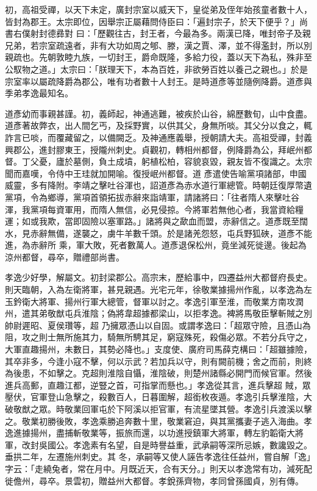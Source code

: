 \begin{pinyinscope}
 初，高祖受禪，以天下未定，廣封宗室以威天下，皇從弟及侄年始孩童者數十人，皆封為郡王。太宗即位，因舉宗正屬藉問侍臣曰：「遍封宗子，於天下便乎？」尚書右僕射封德彞對
 曰：「歷觀往古，封王者，今最為多。兩漢已降，唯封帝子及親兄弟，若宗室疏遠者，非有大功如周之郇、滕，漢之賈、澤，並不得濫封，所以別親疏也。先朝敦睦九族，一切封王，爵命既隆，多給力役，蓋以天下為私，殊非至公馭物之道。」太宗曰：「朕理天下，本為百姓，非欲勞百姓以養己之親也。」於是宗室率以屬疏降爵為郡公，唯有功者數十人封王。是時道彥等並隨例降爵。道彥與季弟孝逸最知名。



 道彥幼而事親甚謹。初，義師起，神通逃難，被疾於山谷，綿歷數旬，山中食盡。道彥著故弊衣，出人間乞丐，及採野實，以供其父，身無所啖。其父分以食之，輒詐言已啖，而覆藏留之，以備闕乏。及神通應義舉，授朝請大夫。高祖受禪，封義興郡公，進封膠東王，授隴州刺史。貞觀初，轉相州都督，例降爵為公，拜岷州都督。丁父憂，廬於墓側，負土成墳，躬植松柏，容貌哀毀，親友皆不復識之。太宗聞而嘉嘆，令侍中王珪就加開喻。復授岷州都督。道
 彥遣使告喻黨項諸部，申國威靈，多有降附。李靖之擊吐谷渾也，詔道彥為赤水道行軍總管。時朝廷復厚幣遺黨項，令為鄉導，黨項首領拓拔赤辭來詣靖軍，請諸將曰：「往者隋人來擊吐谷渾，我黨項每資軍用，而隋人無信，必見侵掠。今將軍若無他心者，我當資給糧運；如或我欺，當即固險以塞軍路。」諸將與之歃血而盟，赤辭信之。道彥既至闊水，見赤辭無備，遂襲之，虜牛羊數千頭。於是諸羌怨怒，屯兵野狐硤，道彥不能進，為赤辭所
 乘，軍大敗，死者數萬人。道彥退保松州，竟坐減死徙邊。後起為涼州都督，尋卒，贈禮部尚書。



 孝逸少好學，解屬文。初封梁郡公。高宗末，歷給事中，四遷益州大都督府長史。則天臨朝，入為左衛將軍，甚見親遇。光宅元年，徐敬業據揚州作亂，以孝逸為左玉鈐衛大將軍、揚州行軍大總管，督軍以討之。孝逸引軍至淮，而敬業方南攻潤州，遣其弟敬猷屯兵淮陰；偽將韋超據都梁山，以拒孝逸。裨將馬敬臣擊斬賊之別帥尉遲昭、夏侯瓚等，超
 乃擁眾憑山以自固。或謂孝逸曰：「超眾守險，且憑山為阻，攻之則士無所施其力，騎無所騁其足，窮寇殊死，殺傷必眾。不若分兵守之，大軍直趣揚州，未數日，其勢必降也。」支度使、廣府司馬薛克構曰：「超雖據險，其卒非多，今逢小寇不擊，何以示武？若加兵以守，則有闕前機；舍之而前，則終為後患，不如擊之。克超則淮陰自懾，淮陰破，則楚州諸縣必開門而候官軍。然後進兵高郵，直趣江都，逆豎之首，可指掌而懸也。」孝逸從其言，進兵擊超
 賊，眾壓伏，官軍登山急擊之，殺數百人，日暮圍解，超銜枚夜遁。孝逸引兵擊淮陰，大破敬猷之眾。時敬業回軍屯於下阿溪以拒官軍，有流星墜其營。孝逸引兵渡溪以擊之。敬業初勝後敗，孝逸乘勝追奔數十里，敬業窘迫，與其黨攜妻子逃入海曲。孝逸進據揚州，盡捕斬敬業等，振旅而還，以功進授鎮軍大將軍，轉左豹韜衛大將軍，改封吳國公。孝逸素有名望，自是時譽益重，武承嗣等深所忌嫉，數讒毀之。垂拱二年，左遷施州刺史。其
 冬，承嗣等又使人誣告孝逸往任益州，嘗自解「逸」字云：「走繞兔者，常在月中。月既近天，合有天分。」則天以孝逸常有功，減死配徙儋州，尋卒。景雲初，贈益州大都督。孝銳孫齊物，孝同曾孫國貞，別有傳。




\end{pinyinscope}
